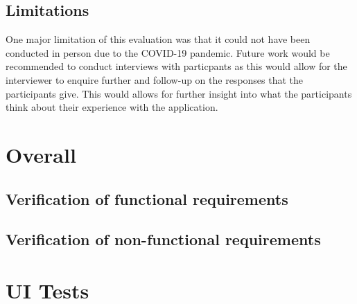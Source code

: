 \documentclass{l4proj}
\begin{document}
\subsection{Limitations}
One major limitation of this evaluation was that it could not have been conducted in person due to the COVID-19 pandemic. Future work
would be recommended to conduct interviews with particpants as this would allow for the interviewer to enquire further and follow-up
on the responses that the participants give. This would allows for further insight into what the participants think about their 
experience with the application.

\section{Overall}
\subsection{Verification of functional requirements}
\subsection{Verification of non-functional requirements}

\section{UI Tests}
\end{document}
